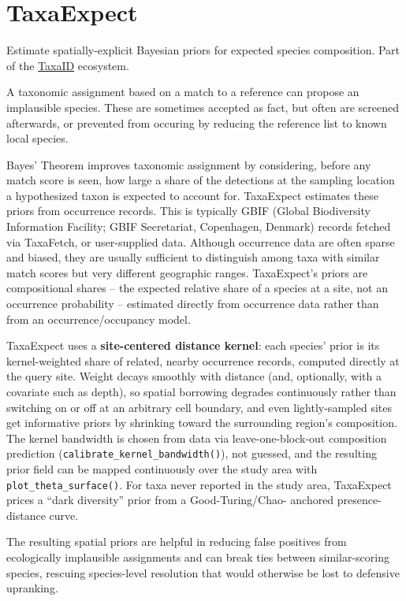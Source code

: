 \documentclass[
]{article}
\author{}
\date{\vspace{-2.5em}}
\begin{document}
\section{TaxaExpect}\label{taxaexpect}

Estimate spatially-explicit Bayesian priors for expected species
composition. Part of the
\href{https://github.com/DOI-USGS/TaxaID}{TaxaID} ecosystem.

A taxonomic assignment based on a match to a reference can propose an
implausible species. These are sometimes accepted as fact, but often are
screened afterwards, or prevented from occuring by reducing the
reference list to known local species.

Bayes' Theorem improves taxonomic assignment by considering, before any
match score is seen, how large a share of the detections at the sampling
location a hypothesized taxon is expected to account for. TaxaExpect
estimates these priors from occurrence records. This is typically GBIF
(Global Biodiversity Information Facility; GBIF Secretariat, Copenhagen,
Denmark) records fetched via TaxaFetch, or user-supplied data. Although
occurrence data are often sparse and biased, they are usually sufficient
to distinguish among taxa with similar match scores but very different
geographic ranges. TaxaExpect's priors are compositional shares -- the
expected relative share of a species at a site, not an occurrence
probability -- estimated directly from occurrence data rather than from
an occurrence/occupancy model.

TaxaExpect uses a \textbf{site-centered distance kernel}: each species'
prior is its kernel-weighted share of related, nearby occurrence
records, computed directly at the query site. Weight decays smoothly
with distance (and, optionally, with a covariate such as depth), so
spatial borrowing degrades continuously rather than switching on or off
at an arbitrary cell boundary, and even lightly-sampled sites get
informative priors by shrinking toward the surrounding region's
composition. The kernel bandwidth is chosen from data via
leave-one-block-out composition prediction
(\texttt{calibrate\_kernel\_bandwidth()}), not guessed, and the
resulting prior field can be mapped continuously over the study area
with \texttt{plot\_theta\_surface()}. For taxa never reported in the
study area, TaxaExpect prices a ``dark diversity'' prior from a
Good-Turing/Chao- anchored presence-distance curve.

The resulting spatial priors are helpful in reducing false positives
from ecologically implausible assignments and can break ties between
similar-scoring species, rescuing species-level resolution that would
otherwise be lost to defensive upranking.
\end{document}
